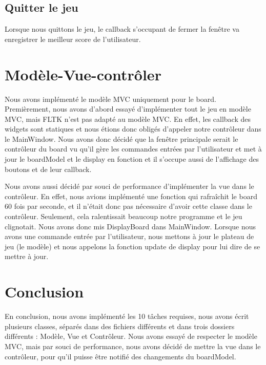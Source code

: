 \documentclass[utf8]{article}
\begin{document}
\begin{large}
\subsection{Quitter le jeu}
\indent
\par
Lorsque nous quittons le jeu, le callback s'occupant de fermer la fenêtre va
enregistrer le meilleur score de l'utilisateur.
\par

\section{Modèle-Vue-contrôler}
\indent
\par
Nous avons implémenté le modèle MVC uniquement pour le board. Premièrement, nous
avons d'abord essayé d'implémenter tout le jeu en modèle MVC, mais FLTK n'est
pas adapté au modèle MVC. En effet, les callback des widgets sont statiques et
nous étions donc obligés d'appeler notre contrôleur dans le MainWindow. Nous
avons donc décidé que la fenêtre principale serait le contrôleur du board vu
qu'il gère les commandes entrées par l'utilisateur et met à jour le boardModel
et le display en fonction et il s'occupe aussi de l'affichage des boutons et de
leur callback.
\par
Nous avons aussi décidé par souci de performance d'implémenter la vue dans le
contrôleur. En effet, nous avions implémenté une fonction qui rafraîchit le
board 60 fois par seconde, et il n'était donc pas nécessaire d'avoir cette
classe dans le contrôleur. Seulement, cela ralentissait beaucoup notre programme
et le jeu clignotait. Nous avons donc mis DisplayBoard dans MainWindow. Lorsque
nous avons une commande entrée par l'utilisateur, nous mettons à jour le plateau
de jeu (le modèle) et nous appelons la fonction update de display pour
lui dire de se mettre à jour. 
\par
\section{Conclusion}
\indent
\par
En conclusion, nous avons implémenté les 10 tâches requises, nous avons écrit
plusieurs classes, séparés dans des fichiers différents et dans trois dossiers
différents : Modèle, Vue et Contrôleur. Nous avons essayé de respecter le modèle
MVC, mais par souci de performance, nous avons décidé de mettre la vue dans le
contrôleur, pour qu'il puisse être notifié des changements du boardModel.
\par

\end{large}
\end{document}
